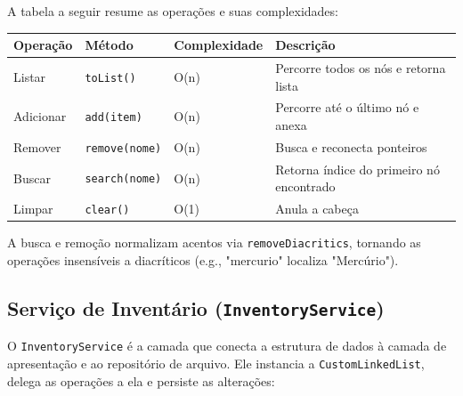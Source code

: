 \documentclass[12pt,a4paper]{article}
\begin{document}
A tabela a seguir resume as operações e suas complexidades:

\begin{table}[H]
\centering
\begin{tabular}{|l|l|l|l|}
\hline
\textbf{Operação} & \textbf{Método} & \textbf{Complexidade} & \textbf{Descrição} \\
\hline
Listar & \texttt{toList()} & O(n) & Percorre todos os nós e retorna lista \\
\hline
Adicionar & \texttt{add(item)} & O(n) & Percorre até o último nó e anexa \\
\hline
Remover & \texttt{remove(nome)} & O(n) & Busca e reconecta ponteiros \\
\hline
Buscar & \texttt{search(nome)} & O(n) & Retorna índice do primeiro nó encontrado \\
\hline
Limpar & \texttt{clear()} & O(1) & Anula a cabeça \\
\hline
\end{tabular}
\end{table}

A busca e remoção normalizam acentos via \texttt{removeDiacritics}, tornando as operações insensíveis a diacríticos (e.g., "mercurio" localiza "Mercúrio").

\subsection{Serviço de Inventário (\texttt{InventoryService})}

O \texttt{InventoryService} é a camada que conecta a estrutura de dados à camada de apresentação e ao repositório de arquivo. Ele instancia a \texttt{CustomLinkedList}, delega as operações a ela e persiste as alterações:
\end{document}
